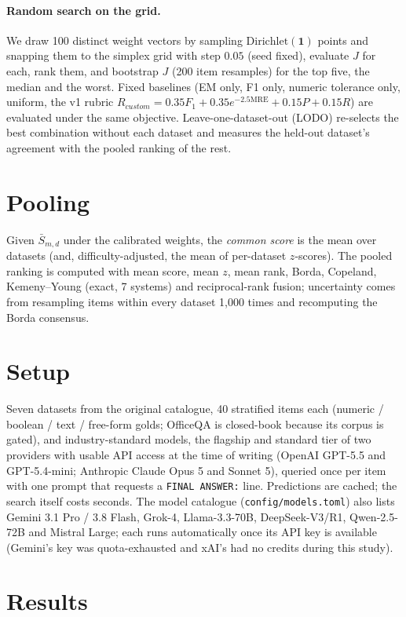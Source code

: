 \documentclass[10pt,twocolumn]{article}
\begin{document}
\paragraph{Random search on the grid.} We draw 100 distinct weight vectors by sampling $\mathrm{Dirichlet}(\mathbf 1)$ points and snapping them to the simplex grid with step $0.05$ (seed fixed), evaluate $J$ for each, rank them, and bootstrap $J$ (200 item resamples) for the top five, the median and the worst. Fixed baselines (EM only, F1 only, numeric tolerance only, uniform, the v1 rubric $R_{custom}=0.35F_1+0.35e^{-2.5\mathrm{MRE}}+0.15P+0.15R$) are evaluated under the same objective. Leave-one-dataset-out (LODO) re-selects the best combination without each dataset and measures the held-out dataset's agreement with the pooled ranking of the rest.

\section{Pooling}\label{sec:pool}
Given $\bar S_{m,d}$ under the calibrated weights, the \emph{common score} is the mean over datasets (and, difficulty-adjusted, the mean of per-dataset $z$-scores). The pooled ranking is computed with mean score, mean $z$, mean rank, Borda, Copeland, Kemeny--Young (exact, 7 systems) and reciprocal-rank fusion; uncertainty comes from resampling items within every dataset 1{,}000 times and recomputing the Borda consensus.

\section{Setup}
Seven datasets from the original catalogue, 40 stratified items each (numeric / boolean / text / free-form golds; OfficeQA is closed-book because its corpus is gated), and \nModels{} industry-standard models, the flagship and standard tier of two providers with usable API access at the time of writing (OpenAI GPT-5.5 and GPT-5.4-mini; Anthropic Claude Opus 5 and Sonnet 5), queried once per item with one prompt that requests a \texttt{FINAL ANSWER:} line. Predictions are cached; the search itself costs seconds. The model catalogue (\texttt{config/models.toml}) also lists Gemini 3.1 Pro / 3.8 Flash, Grok-4, Llama-3.3-70B, DeepSeek-V3/R1, Qwen-2.5-72B and Mistral Large; each runs automatically once its API key is available (Gemini's key was quota-exhausted and xAI's had no credits during this study).

\section{Results}\label{sec:results}
\end{document}
